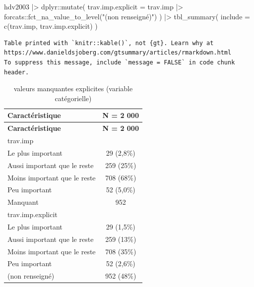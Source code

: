 \documentclass[
  letterpaper,
  DIV=11,
  numbers=noendperiod,
  oneside]{scrreprt}
\newenvironment{Shaded}{\begin{snugshade}}{\end{snugshade}}
\newcommand{\AttributeTok}[1]{\textcolor[rgb]{0.40,0.45,0.13}{#1}}
\newcommand{\FunctionTok}[1]{\textcolor[rgb]{0.28,0.35,0.67}{#1}}
\newcommand{\NormalTok}[1]{\textcolor[rgb]{0.00,0.23,0.31}{#1}}
\newcommand{\SpecialCharTok}[1]{\textcolor[rgb]{0.37,0.37,0.37}{#1}}
\newcommand{\StringTok}[1]{\textcolor[rgb]{0.13,0.47,0.30}{#1}}
\begin{document}
\begin{Shaded}
\begin{Highlighting}[]
\NormalTok{hdv2003 }\SpecialCharTok{|\textgreater{}}
\NormalTok{  dplyr}\SpecialCharTok{::}\FunctionTok{mutate}\NormalTok{(}
    \AttributeTok{trav.imp.explicit =}\NormalTok{ trav.imp }\SpecialCharTok{|\textgreater{}} 
\NormalTok{      forcats}\SpecialCharTok{::}\FunctionTok{fct\_na\_value\_to\_level}\NormalTok{(}\StringTok{"(non renseigné)"}\NormalTok{)}
\NormalTok{  ) }\SpecialCharTok{|\textgreater{}} 
  \FunctionTok{tbl\_summary}\NormalTok{(}
    \AttributeTok{include =} \FunctionTok{c}\NormalTok{(trav.imp, trav.imp.explicit)}
\NormalTok{  )}
\end{Highlighting}
\end{Shaded}

\begin{verbatim}
Table printed with `knitr::kable()`, not {gt}. Learn why at
https://www.danieldsjoberg.com/gtsummary/articles/rmarkdown.html
To suppress this message, include `message = FALSE` in code chunk header.
\end{verbatim}

\hypertarget{tbl-explicit-na}{}
\begin{longtable}[]{@{}lc@{}}
\caption{\label{tbl-explicit-na}valeurs manquantes explicites (variable
catégorielle)}\tabularnewline
\toprule()
\textbf{Caractéristique} & \textbf{N = 2 000} \\
\midrule()
\endfirsthead
\toprule()
\textbf{Caractéristique} & \textbf{N = 2 000} \\
\midrule()
\endhead
trav.imp & \\
Le plus important & 29 (2,8\%) \\
Aussi important que le reste & 259 (25\%) \\
Moins important que le reste & 708 (68\%) \\
Peu important & 52 (5,0\%) \\
Manquant & 952 \\
trav.imp.explicit & \\
Le plus important & 29 (1,5\%) \\
Aussi important que le reste & 259 (13\%) \\
Moins important que le reste & 708 (35\%) \\
Peu important & 52 (2,6\%) \\
(non renseigné) & 952 (48\%) \\
\bottomrule()
\end{longtable}
\end{document}
